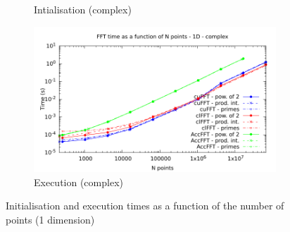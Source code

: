\documentclass[12pt, a4paper]{article}
\begin{document}
\begin{figure}[H]
\begin{subfigure}{.5\textwidth}
\caption{Intialisation (complex)}
\label{FFT1DCI}
\end{subfigure}%
\begin{subfigure}{.5\textwidth}
\centering
\includegraphics[width=.9\linewidth]{graphs/fft-1d-c-exec.pdf}
\caption{Execution (complex)}
\label{FFT1DCE}
\end{subfigure}
\caption{Initialisation and execution times as a function of the number of points (1 dimension)}
\label{FFT1D}
\end{figure}
\end{document}
